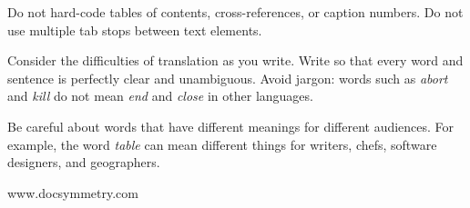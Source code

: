 \documentclass[12pt]{article}
\begin{document}
Do not hard-code tables of contents, cross-references, or caption numbers. Do not use multiple tab stops between text elements.

Consider the difficulties of translation as you write. Write so that every word and sentence is perfectly clear and unambiguous. Avoid jargon: words such as \emph{abort} and \emph{kill} do not mean \emph{end} and \emph{close} in other languages. 

Be careful about words that have different meanings for different audiences. For example, the word \emph{table} can mean different things for writers, chefs, software designers, and geographers.

www.docsymmetry.com

\end{document}

